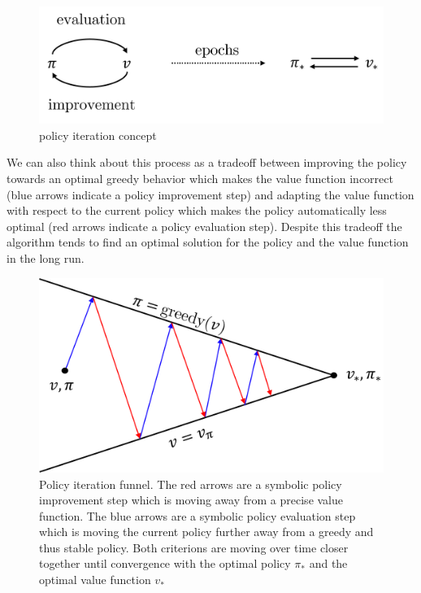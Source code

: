 % 
\begin{figure}
    \begin{center}
        \includegraphics[width=0.5\linewidth]{figures/background/PolicyIterationConcept.png}
        \caption[policy iteration concept]{policy iteration concept}
        \label{fig:policy-iteration-concept}
    \end{center}
\end{figure}

We can also think about this process as a tradeoff between improving the policy towards an optimal greedy behavior which makes the value function incorrect (blue arrows indicate a policy improvement step) and adapting the value function with respect to the current policy which makes the policy automatically less optimal (red arrows indicate a policy evaluation step).  Despite this tradeoff the algorithm tends to find an optimal solution for the policy and the value function in the long run. 

% 
\begin{figure}
    \begin{center}
        \includegraphics[width=0.5\linewidth]{figures/background/PolicyIterationFunnel.png}
        \caption[Policy iteration funnel]{Policy iteration funnel. The red arrows are a symbolic policy improvement step which is moving away from a precise value function. The blue arrows are a symbolic policy evaluation step which is moving the current policy further away from a greedy and thus stable policy. Both criterions are moving over time closer together until convergence with the optimal policy $\pi_*$ and the optimal value function $v_*$}
        \label{fig:policy-iteration-concept-funnel}
    \end{center}
\end{figure}

